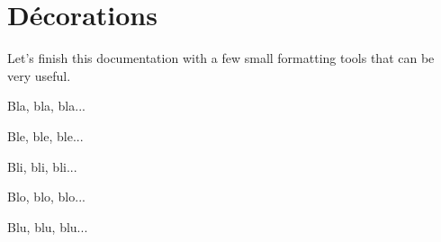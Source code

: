 \documentclass[10pt, a4paper]{article}
\begin{document}
\section{Décorations}

Let's finish this documentation with a few small formatting tools that can be very useful.

\begin{tdoclatex}[sbs]
Bla, bla, bla...

\tdocsep %

Ble, ble, ble...

Bli, bli, bli...

\tdocxspace %

Blo, blo, blo...

Blu, blu, blu...

\end{tdoclatex}
\end{document}

